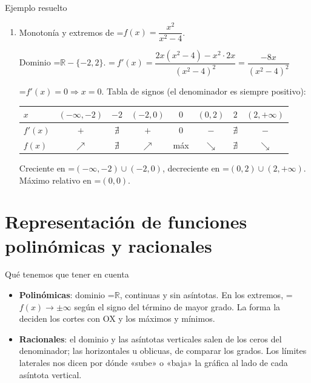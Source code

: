 \documentclass[11pt,a4paper]{article}
\newcommand{\fmm}[1]{\setbox0=\hbox{$#1$}\ifdim\wd0>\linewidth\[#1\]\else\mbox{\box0}\fi}
\begin{document}
  
\begin{fmex}{Ejemplo resuelto}
\begin{enumerate}[label=\textbf{\arabic*.},leftmargin=*]
\item Monotonía y extremos de \fmm{f(x)=\dfrac{x^2}{x^2-4}}.
          

            

Dominio \fmm{\mathbb R-\{-2,2\}}. \fmm{\ f'(x)=\dfrac{2x(x^2-4)-x^2\cdot2x}{(x^2-4)^2}=\dfrac{-8x}{(x^2-4)^2}}

            

\fmm{f'(x)=0\Rightarrow x=0}. Tabla de signos (el denominador es siempre positivo):

              
\begin{center}\small\renewcommand{\arraystretch}{1.6}\begin{tabular}{l|ccccccc}\toprule
\textbf{$x$} & $(-\infty,-2)$ & \cellcolor{fmsurface}$-2$ & $(-2,0)$ & \cellcolor{fmsurface}$0$ & $(0,2)$ & \cellcolor{fmsurface}$2$ & $(2,+\infty)$\\\midrule
\textbf{$f'(x)$} & \textbf{\color{fmok}$+$} & \cellcolor{fmsurface}$\nexists$ & \textbf{\color{fmok}$+$} & \cellcolor{fmsurface}0 & \textbf{\color{fmas}$-$} & \cellcolor{fmsurface}$\nexists$ & \textbf{\color{fmas}$-$}\\\midrule
\textbf{$f(x)$} & {\Large\color{fmok}$\nearrow$} & \cellcolor{fmsurface}$\nexists$ & {\Large\color{fmok}$\nearrow$} & \cellcolor{fmsurface}máx & {\Large\color{fmas}$\searrow$} & \cellcolor{fmsurface}$\nexists$ & {\Large\color{fmas}$\searrow$}\\
\bottomrule\end{tabular}\end{center}

            

Creciente en \fmm{(-\infty,-2)\cup(-2,0)}, decreciente en \fmm{(0,2)\cup(2,+\infty)}. Máximo relativo en \fmm{(0,0)}.
\end{enumerate}
\end{fmex}

  
\section{Representación de funciones polinómicas y racionales}\hypertarget{sec7}{}

  

  
\begin{fmprop}{Qué tenemos que tener en cuenta}
\begin{itemize}
\item \textbf{Polinómicas}: dominio \fmm{\mathbb R}, continuas y sin asíntotas. En los extremos, \fmm{f(x)\to\pm\infty} según el signo del término de mayor grado. La forma la deciden los cortes con OX y los máximos y mínimos.
\item \textbf{Racionales}: el dominio y las asíntotas verticales salen de los ceros del denominador; las horizontales u oblicuas, de comparar los grados. Los límites laterales nos dicen por dónde «sube» o «baja» la gráfica al lado de cada asíntota vertical.
\end{itemize}
\end{fmprop}
\end{document}
